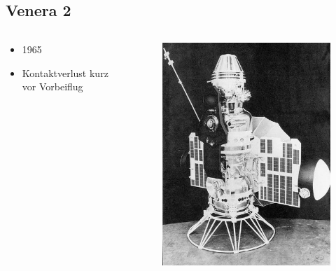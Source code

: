 \documentclass{beamer}
\begin{document}
	\subsection{Venera 2}
	\begin{frame}
		\begin{columns}
			\begin{column}{0.5\textwidth}
				\begin{itemize}
					\item 1965
					\item Kontaktverlust kurz vor Vorbeiflug
				\end{itemize}
			\end{column}
			\begin{column}{0.4\textwidth}
				\begin{figure}[ht]
					\includegraphics[scale=0.3]{./images/venera_2}
				\end{figure}
			\end{column}
		\end{columns}
	\end{frame}
\end{document}
